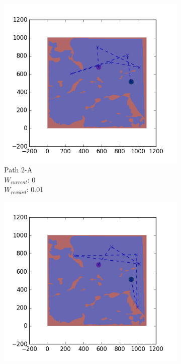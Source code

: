 \documentclass{tamuccthesis}
\begin{document}
\begin{figure}
    \begin{subfigure}[b]{0.24\textwidth}
        \centering
        \includegraphics[width=\textwidth,trim={4cm 3cm 2cm 3cm},clip]{EXP3RG_PathBa_-1_-1_0_0d01.png}
        \caption[]{{\small Path 2-A \\ $W_{current}$: 0 \\ $W_{reward}$: 0.01}}    
        \label{fig:Path_2-A_upReward_noWork}
    \end{subfigure}
    \begin{subfigure}[b]{0.24\textwidth}  
        \centering 
        \includegraphics[width=\textwidth,trim={4cm 3cm 2cm 3cm},clip]{EXP3RG_PathBa_-1_-1_-1_0d01.png}

\end{subfigure}
\end{figure}
\end{document}
